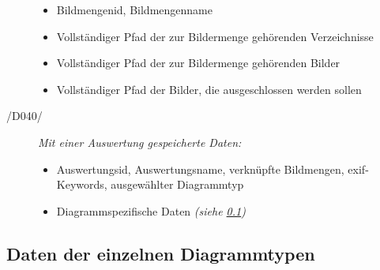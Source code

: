 \begin{description}
	\begin{itemize}
	
		\item Bildmengenid, Bildmengenname
		
		\item Vollständiger Pfad der zur Bildermenge gehörenden Verzeichnisse
		
		\item Vollständiger Pfad der zur Bildermenge gehörenden Bilder
		
		\item Vollständiger Pfad der Bilder, die ausgeschlossen werden sollen
	
	\end{itemize}
	
	\item[/D040/] \textit{Mit einer Auswertung gespeicherte Daten:}
	
	\begin{itemize}
		
		\item Auswertungsid, Auswertungsname, verknüpfte Bildmengen, \gls{exif}-Keywords, ausgewählter Diagrammtyp
		
		\item Diagrammspezifische Daten \itshape{(siehe \ref{subsec:daten-diagrammtypen})}
	
	\end{itemize}
		
\end{description}

\subsection{Daten der einzelnen Diagrammtypen}

\label{subsec:daten-diagrammtypen}


